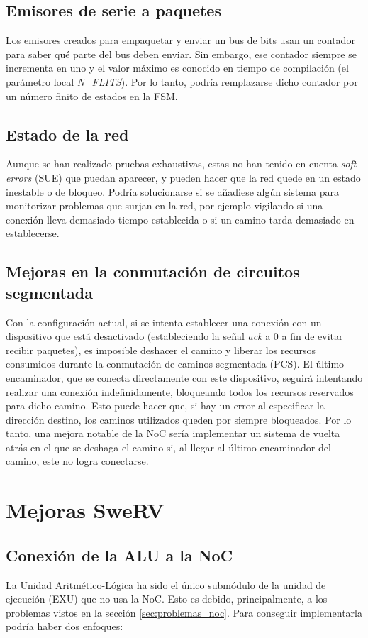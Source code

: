 \subsection{Emisores de serie a paquetes}
Los emisores creados para empaquetar y enviar un bus de bits usan un contador para saber qué parte del bus deben enviar. Sin embargo, ese contador siempre se incrementa en uno y el valor máximo es conocido en tiempo de compilación (el parámetro local \textit{N\_FLITS}). Por lo tanto, podría remplazarse dicho contador por un número finito de estados en la FSM.

\subsection{Estado de la red}
Aunque se han realizado pruebas exhaustivas, estas no han tenido en cuenta \textit{soft errors} (SUE) que puedan aparecer, y pueden hacer que la red quede en un estado inestable o de bloqueo. Podría solucionarse si se añadiese algún sistema para monitorizar problemas que surjan en la red, por ejemplo vigilando si una conexión lleva demasiado tiempo establecida o si un camino tarda demasiado en establecerse.

\subsection{Mejoras en la conmutación de circuitos segmentada}

Con la configuración actual, si se intenta establecer una conexión con un dispositivo que está desactivado (estableciendo la señal \textit{ack} a 0 a fin de evitar recibir paquetes), es imposible deshacer el camino y liberar los recursos consumidos durante la conmutación de caminos segmentada (PCS). El último encaminador, que se conecta directamente con este dispositivo, seguirá intentando realizar una conexión indefinidamente, bloqueando todos los recursos reservados para dicho camino. Esto puede hacer que, si hay un error al especificar la dirección destino, los caminos utilizados queden por siempre bloqueados. Por lo tanto, una mejora notable de la NoC sería implementar un sistema de vuelta atrás en el que se deshaga el camino si, al llegar al último encaminador del camino, este no logra conectarse.

\section{Mejoras SweRV}

\subsection{Conexión de la ALU a la NoC}
\label{subsec:futuro_alu_noc}
La Unidad Aritmético-Lógica ha sido el único submódulo de la unidad de ejecución (EXU) que no usa la NoC. Esto es debido, principalmente, a los problemas vistos en la sección \ref{sec:problemas_noc}. Para conseguir implementarla podría haber dos enfoques:

